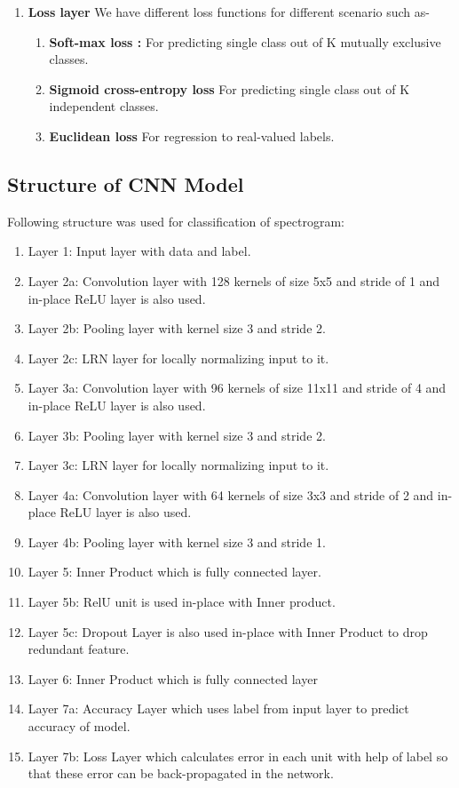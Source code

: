 \documentclass[11pt]{report}
\begin{document}
\begin{enumerate}
\item \textbf{Loss layer}
We have different loss functions for different scenario such as-
\begin{enumerate}
\item \textbf{Soft-max loss :} For predicting single class out of K mutually exclusive classes. 
\item \textbf{Sigmoid cross-entropy loss} For predicting single class out of K independent classes. 
\item \textbf{Euclidean loss} For regression to real-valued labels.
\end{enumerate}
\end{enumerate}



\subsection{Structure of CNN Model}
Following structure was used for classification of spectrogram:
\begin{enumerate}
\item Layer 1: Input layer with data and label.
\item Layer 2a: Convolution layer with 128 kernels of size 5x5 and stride of 1 and in-place ReLU layer is also used.
\item Layer 2b: Pooling layer with kernel size 3 and stride 2.
\item Layer 2c: LRN layer for locally normalizing input to it.
\item Layer 3a: Convolution layer with 96 kernels of size 11x11 and stride of 4 and in-place ReLU layer is also used.
\item Layer 3b: Pooling layer with kernel size 3 and stride 2.
\item Layer 3c: LRN layer for locally normalizing input to it.
\item Layer 4a: Convolution layer with 64 kernels of size 3x3 and stride of 2 and in-place ReLU layer is also  used.
\item Layer 4b: Pooling layer with kernel size 3 and stride 1.
\item Layer 5: Inner Product which is fully connected layer.
\item Layer 5b: RelU unit is used in-place with Inner product.
\item Layer 5c: Dropout Layer is also used in-place with Inner Product to drop redundant feature.
\item Layer 6: Inner Product which is fully connected layer
\item Layer 7a: Accuracy Layer which uses label from input layer to predict accuracy of model.
\item Layer 7b: Loss Layer which calculates error in each unit with help of label so that these error can be back-propagated  in the network.
\end{enumerate}
\end{document}
